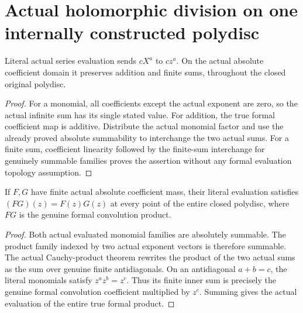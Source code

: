 \section{Actual holomorphic division on one internally constructed polydisc}

\begin{theorem}
\label{hir:actual-polydisc-evaluation-additive-algebra}
Literal actual series evaluation sends $cX^a$ to $cz^a$. On the
actual absolute coefficient domain it preserves addition and finite
sums, throughout the closed original polydisc.
\leanok
\end{theorem}
\begin{proof}
For a monomial, all coefficients except the actual exponent are zero,
so the actual infinite sum has its single stated value. For addition,
the true formal coefficient map is additive. Distribute the actual
monomial factor and use the already proved absolute summability to
interchange the two actual sums. For a finite sum, coefficient
linearity followed by the finite-sum interchange for genuinely
summable families proves the assertion without any formal evaluation
topology assumption.
\end{proof}

\begin{theorem}
\label{hir:actual-polydisc-evaluation-multiplicative-algebra}
If $F,G$ have finite actual absolute coefficient mass, their literal
evaluation satisfies $(FG)(z)=F(z)G(z)$ at every point of the entire
closed polydisc, where $FG$ is the genuine formal convolution product.
\leanok
\end{theorem}
\begin{proof}
Both actual evaluated monomial families are absolutely summable.
The product family indexed by two actual exponent vectors is therefore
summable. The actual Cauchy-product theorem rewrites the product of
the two actual sums as the sum over genuine finite antidiagonals.
On an antidiagonal $a+b=c$, the literal monomials satisfy
$z^az^b=z^c$. Thus its finite inner sum is precisely the genuine
formal convolution coefficient multiplied by $z^c$. Summing gives
the actual evaluation of the entire true formal product.
\end{proof}

